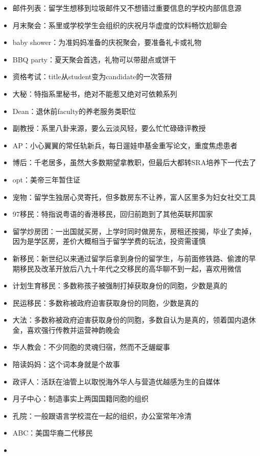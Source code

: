 \documentclass[]{tufte-book}
\begin{document}
\begin{itemize}
\item
  邮件列表：留学生想移到垃圾邮件又不想错过重要信息的学校内部信息源
\item
  月末聚会：系里或学校学生会组织的庆祝月华虚度的饮料畅饮尬聊会
\item
  baby shower：为准妈妈准备的庆祝聚会，要准备礼卡或礼物
\item
  BBQ party：夏天聚会首选，礼物可以带甜点或饼干
\item
  资格考试：title从student变为candidate的一次答辩
\item
  大秘：特指系里秘书，绝对不能惹又绝对可依赖系列
\item
  Dean：退休前faculty的养老服务类职位
\item
  副教授：系里八卦来源，要么云淡风轻，要么忙忙碌碌评教授
\item
  AP：小心翼翼的常任轨新兵，每日遛娃申基金重写论文，重度焦虑患者
\item
  博后：千老居多，虽然大多数期望拿教职，但最后大都转SRA培养下一代去了
\item
  opt：美帝三年暂住证
\item
  宠物：留学生独居心灵寄托，但多数房东不让养，富人区里多为妇女社交工具
\item
  97移民：特指说粤语的香港移民，回归前跑到了其他英联邦国家
\item
  留学炒房团：一出国就买房，上学时同时做房东，房租还按揭，毕业了卖掉，因为是学区房，差价大概相当于留学学费的玩法，投资需谨慎
\item
  新移民：新世纪以来通过留学后拿到身份的留学生，与前面修铁路、偷渡的早期移民及改革开放后八九十年代之交移民的高华聊不到一起，喜欢用微信
\item
  计划生育移民：多数称孩子被强制打掉获取身份的同胞，少数是真的
\item
  民运移民：多数称被政府迫害获取身份的同胞，少数是真的
\item
  大法：多数称被政府迫害获取身份的同胞，多数自认为是真的，领着国内退休金，喜欢强行传教并运营神韵晚会
\item
  华人教会：不少同胞的灵魂归宿，然而不乏龌龊事
\item
  陪读妈妈：这个词本身就是个故事
\item
  政评人：活跃在油管上以取悦海外华人与营造优越感为生的自媒体
\item
  月子中心：制造事实上两国国籍同胞的组织
\item
  孔院：一般跟语言学校混在一起的组织，办公室常年冷清
\item
  ABC：美国华裔二代移民
\item

\end{itemize}
\end{document}
